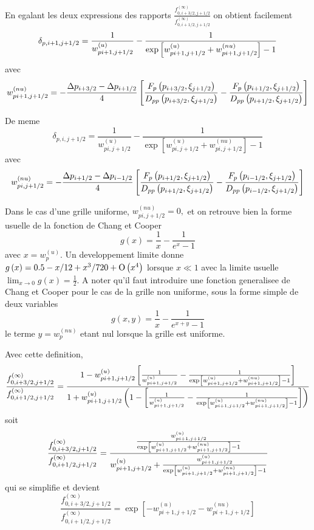 En egalant les deux expressions des rapports $\frac{f_{0,i+3/2,j+1/2}^{(%
\infty)}}{f_{0,i+1/2,j+1/2}^{(\infty)}}$ on obtient facilement 
\[
\delta_{p,i+1,j+1/2}=\frac{1}{w_{pi+1,j+1/2}^{(u)}}-\frac{1}{%
\exp\left[w_{pi+1,j+1/2}^{(u)}+w_{pi+1,j+1/2}^{(nu)}\right]-1}
\]
avec 
\[
w_{pi+1,j+1/2}^{(nu)}=-\frac{\Delta p_{i+3/2}-\Delta p_{i+1/2}}{4}\left[%
\frac{F_{p}\left(p_{i+3/2},\xi_{j+1/2}\right)}{D_{pp}\left(p_{i+3/2},%
\xi_{j+1/2}\right)}-\frac{F_{p}\left(p_{i+1/2},\xi_{j+1/2}\right)}{%
D_{pp}\left(p_{i+1/2},\xi_{j+1/2}\right)}\right]
\]

De meme 
\[
\delta_{p,i,j+1/2}=\frac{1}{w_{pi,j+1/2}^{(u)}}-\frac{1}{\exp%
\left[w_{pi,j+1/2}^{(u)}+w_{pi,j+1/2}^{(nu)}\right]-1}
\]
avec 
\[
w_{pi,j+1/2}^{(nu)}=-\frac{\Delta p_{i+1/2}-\Delta p_{i-1/2}}{4}\left[\frac{%
F_{p}\left(p_{i+1/2},\xi_{j+1/2}\right)}{D_{pp}\left(p_{i+1/2},\xi_{j+1/2}%
\right)}-\frac{F_{p}\left(p_{i-1/2},\xi_{j+1/2}\right)}{D_{pp}%
\left(p_{i-1/2},\xi_{j+1/2}\right)}\right]
\]

Dans le cas d'une grille uniforme, $w_{pi,j+1/2}^{(nu)}=0,$ et on retrouve
bien la forme usuelle de la fonction de Chang et Cooper 
\[
g\left(x\right)=\frac{1}{x}-\frac{1}{e^{x}-1}
\]
avec $x=w_{p}^{(u)}.$ Un developpement limite donne $g\left(x%
\right)=0.5-x/12+x^{3}/720+{\rm O}\left(x^{4}\right)$ lorsque $x\ll1$ avec
la limite usuelle $\lim_{x\rightarrow0}g\left(x\right)=\frac{1}{2}.$ A noter
qu'il faut introduire une fonction generalisee de Chang et Cooper pour le
cas de la grille non uniforme, sous la forme simple de deux variables 
\[
g\left(x,y\right)=\frac{1}{x}-\frac{1}{e^{x+y}-1}
\]
le terme $y=w_{p}^{(nu)}$ etant nul lorsque la grille est uniforme.

Avec cette definition, 
\[
\frac{f_{0,i+3/2,j+1/2}^{(\infty)}}{f_{0,i+1/2,j+1/2}^{(\infty)}}=\frac{%
1-w_{pi+1,j+1/2}^{(u)}\left[\frac{1}{w_{pi+1,j+1/2}^{(u)}}-\frac{1}{%
\exp\left[w_{pi+1,j+1/2}^{(u)}+w_{pi+1,j+1/2}^{(nu)}\right]-1}\right]}{%
1+w_{pi+1,j+1/2}^{(u)}\left(1-\left[\frac{1}{w_{pi+1,j+1/2}^{(u)}}-\frac{1}{%
\exp\left[w_{pi+1,j+1/2}^{(u)}+w_{pi+1,j+1/2}^{(nu)}\right]-1}\right]\right)}
\]
soit 
\[
\frac{f_{0,i+3/2,j+1/2}^{(\infty)}}{f_{0,i+1/2,j+1/2}^{(\infty)}}=\frac{%
\frac{w_{pi+1,j+1/2}^{(u)}}{\exp%
\left[w_{pi+1,j+1/2}^{(u)}+w_{pi+1,j+1/2}^{(nu)}\right]-1}}{%
w_{pi+1,j+1/2}^{(u)}+\frac{w_{pi+1,j+1/2}^{(u)}}{\exp%
\left[w_{pi+1,j+1/2}^{(u)}+w_{pi+1,j+1/2}^{(nu)}\right]-1}}
\]
qui se simplifie et devient 
\[
\frac{f_{0,i+3/2,j+1/2}^{(\infty)}}{f_{0,i+1/2,j+1/2}^{(\infty)}}%
=\exp\left[-w_{pi+1,j+1/2}^{(u)}-w_{pi+1,j+1/2}^{(nu)}\right]
\]

